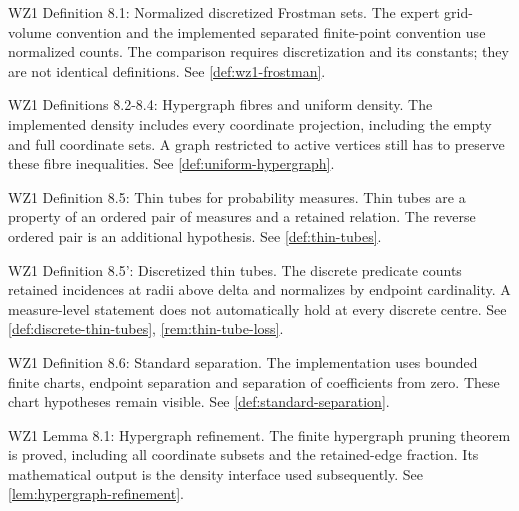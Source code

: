 \begin{remark}
\label{rem:atlas-DFrost}
WZ1 Definition 8.1: Normalized discretized Frostman sets.
The expert grid-volume convention and the implemented separated finite-point convention use normalized counts. The comparison requires discretization and its constants; they are not identical definitions.
See \ref{def:wz1-frostman}.
\end{remark}

\begin{remark}
\label{rem:atlas-Dhyp}
WZ1 Definitions 8.2-8.4: Hypergraph fibres and uniform density.
The implemented density includes every coordinate projection, including the empty and full coordinate sets. A graph restricted to active vertices still has to preserve these fibre inequalities.
See \ref{def:uniform-hypergraph}.
\end{remark}

\begin{remark}
\label{rem:atlas-Dthin}
WZ1 Definition 8.5: Thin tubes for probability measures.
Thin tubes are a property of an ordered pair of measures and a retained relation. The reverse ordered pair is an additional hypothesis.
See \ref{def:thin-tubes}.
\end{remark}

\begin{remark}
\label{rem:atlas-DthinD}
WZ1 Definition 8.5': Discretized thin tubes.
The discrete predicate counts retained incidences at radii above delta and normalizes by endpoint cardinality. A measure-level statement does not automatically hold at every discrete centre.
See \ref{def:discrete-thin-tubes}, \ref{rem:thin-tube-loss}.
\end{remark}

\begin{remark}
\label{rem:atlas-Dsep}
WZ1 Definition 8.6: Standard separation.
The implementation uses bounded finite charts, endpoint separation and separation of coefficients from zero. These chart hypotheses remain visible.
See \ref{def:standard-separation}.
\end{remark}

\begin{remark}
\label{rem:atlas-L8_1}
WZ1 Lemma 8.1: Hypergraph refinement.
The finite hypergraph pruning theorem is proved, including all coordinate subsets and the retained-edge fraction. Its mathematical output is the density interface used subsequently.
See \ref{lem:hypergraph-refinement}.
\end{remark}

